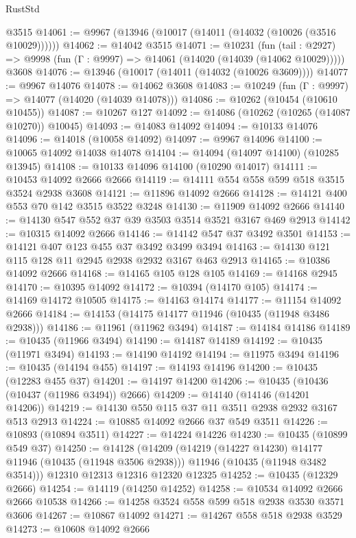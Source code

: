 \begin{lexlean}{RustStd}
\begin{coremodule}
{\begin{coremodule}
{{{{{{{{{{{{{{{{{{{{{{{{{{{{{{{{{{{{{{{{{{{{{{{{{{{{{{{{{{{{{{{{{{{{{{{{{{{{{{    @3515
@14061 := @9967 (@13946 (@10017 (@14011 (@14032 (@10026 (@3516 @10029))))))
@14062 := @14042 @3515
@14071 := @10231
    (fun (tail : @2927) => @9998 (fun (Γ : @9997) => @14061 (@14020 (@14039 (@14062 @10029)))))
    @3608
@14076 := @13946 (@10017 (@14011 (@14032 (@10026 @3609))))
@14077 := @9967 @14076
@14078 := @14062 @3608
@14083 := @10249 (fun (Γ : @9997) => @14077 (@14020 (@14039 @14078)))
@14086 := @10262 (@10454 (@10610 @10455))
@14087 := @10267 @127
@14092 := @14086 (@10262 (@10265 (@14087 @10270)) @10045)
@14093 := @14083 @14092
@14094 := @10133 @14076
@14096 := @14018 (@10058 @14092)
@14097 := @9967 @14096
@14100 := @10065 @14092 @14038 @14078
@14104 := @14094 (@14097 @14100) (@10285 @13945)
@14108 := @10133 @14096 @14100 (@10290 @14017)
@14111 := @10453 @14092 @2666 @2666
@14119 := @14111 @554 @558 @599 @518 @3515 @3524 @2938 @3608
@14121 := @11896 @14092 @2666
@14128 := @14121 @400 @553 @70 @142 @3515 @3522 @3248
@14130 := @11909 @14092 @2666
@14140 := @14130 @547 @552 @37 @39 @3503 @3514 @3521 @3167 @469 @2913
@14142 := @10315 @14092 @2666
@14146 := @14142 @547 @37 @3492 @3501
@14153 := @14121 @407 @123 @455 @37 @3492 @3499 @3494
@14163 := @14130 @121 @115 @128 @11 @2945 @2938 @2932 @3167 @463 @2913
@14165 := @10386 @14092 @2666
@14168 := @14165 @105 @128 @105
@14169 := @14168 @2945
@14170 := @10395 @14092
@14172 := @10394 (@14170 @105)
@14174 := @14169 @14172 @10505
@14175 := @14163 @14174
@14177 := @11154 @14092 @2666
@14184 := @14153 (@14175 @14177 @11946 (@10435 (@11948 @3486 @2938)))
@14186 := @11961 (@11962 @3494)
@14187 := @14184 @14186
@14189 := @10435 (@11966 @3494)
@14190 := @14187 @14189
@14192 := @10435 (@11971 @3494)
@14193 := @14190 @14192
@14194 := @11975 @3494
@14196 := @10435 (@14194 @455)
@14197 := @14193 @14196
@14200 := @10435 (@12283 @455 @37)
@14201 := @14197 @14200
@14206 := @10435 (@10436 (@10437 (@11986 @3494)) @2666)
@14209 := @14140 (@14146 (@14201 @14206))
@14219 := @14130 @550 @115 @37 @11 @3511 @2938 @2932 @3167 @513 @2913
@14224 := @10885 @14092 @2666 @37 @549 @3511
@14226 := @10893 (@10894 @3511)
@14227 := @14224 @14226
@14230 := @10435 (@10899 @549 @37)
@14250 := @14128
    (@14209
      (@14219 (@14227 @14230) @14177 @11946 (@10435 (@11948 @3506 @2938)))
      @11946
      (@10435 (@11948 @3482 @3514)))
    @12310
    @12313
    @12316
    @12320
    @12325
@14252 := @10435 (@12329 @2666)
@14254 := @14119 (@14250 @14252)
@14258 := @10534 @14092 @2666 @2666 @10538
@14266 := @14258 @3524 @558 @599 @518 @2938 @3530 @3571 @3606
@14267 := @10867 @14092
@14271 := @14267 @558 @518 @2938 @3529
@14273 := @10608 @14092 @2666
}}}}}}}}}}}}}}}}}}}}}}}}}}}}}}}}}}}}}}}}}}}}}}}}}}}}}}}}}}}}}}}}}}}}}}}}}}}}}}
\end{coremodule}}
\end{coremodule}
\end{lexlean}
